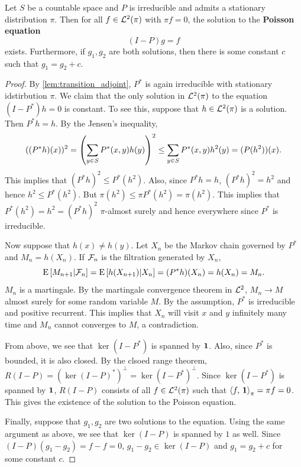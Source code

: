 \begin{theorem}\label{thm:poisson_eq}
    Let $S$ be a countable space and $P$ is irreducible and admits a stationary 
    distribution $\pi$. Then for all $f\in\mathcal{L}^2(\pi)$ with $\pi f = 0$, the solution 
    to the \textbf{Poisson equation} 
    \begin{equation*}
        (I-P)g = f
    \end{equation*}
    exists. Furthermore, if $g_1,g_2$ are both solutions, then there is some 
    constant $c$ such that $g_1 = g_2+c$. 
\end{theorem}
\begin{proof}
    By \cref{lem:transition_adjoint}, $P^*$ is again irreducible with stationary 
    idstirbution $\pi$. We claim that the only solution in $\mathcal{L}^2(\pi)$ to the equation 
    $(I-P^*)h = 0$ is constant. To see this, suppose that $h\in\mathcal{L}^2(\pi)$ is 
    a solution. Then $P^*h = h$. By the Jensen's inequality, 
    \begin{equation*}
        ((P^*h)(x))^2 = \pth{\sum_{y\in S} P^*(x,y)h(y)}^2\leq \sum_{y\in S}P^*(x,y)h^2(y) 
        = (P(h^2))(x). 
    \end{equation*} 
    This implies that $(P^*h)^2 \leq P^*(h^2)$. Also, since $P^*h = h$, $(P^*h)^2 = h^2$ 
    and hence $h^2\leq P^*(h^2)$. But $\pi(h^2) \leq \pi P^*(h^2) = \pi (h^2)$. 
    This implies that $P^*(h^2) = h^2 = (P^*h)^2$ $\pi$-almost surely and hence 
    everywhere since $P^*$ is irreducible. 
    
    Now suppose that $h(x)\neq h(y)$. Let $X_n$ be the Markov chain governed 
    by $P^*$ and $M_n = h(X_n)$. If $\mathcal{F}_n$ is the filtration generated by $X_n$, 
    \begin{equation*}
        \operatorname{E}\left[ {M_{n+1}|\mathcal{F}_n} \right] = \operatorname{E}\left[ {h(X_{n+1})|X_n} \right] = (P^*h)(X_n) = h(X_n) 
        = M_n.
    \end{equation*} 
    $M_n$ is a martingale. By the martingale convergence theorem in $\mathcal{L}^2$, 
    $M_n\to M$ almost surely for some random variable $M$. By the assumption, 
    $P^*$ is irreducible and positive recurrent. This implies that $X_n$ will 
    visit $x$ and $y$ infinitely many time and $M_n$ cannot converges to $M$, 
    a contradiction. 

    From above, we see that $\ker(I-P^*)$ is spanned by $\mathbf{1}$. Also, since $P^*$ 
    is bounded, it is also closed. By the clsoed range theorem, $R(I-P) 
    = (\ker(I-P)^*)^\perp = \ker(I-P^*)^\perp$. Since $\ker(I-P^*)$ is spanned 
    by $\mathbf{1}$, $R(I-P)$ consists of all $f\in \mathcal{L}^2(\pi)$ such that $\left\langle {f},\, {\mathbf{1}} \right\rangle_{\pi} 
    = \pi f = 0$. This gives the existence of the solution to the Poisson 
    equation. 

    Finally, suppose that $g_1,g_2$ are two solutions to the equation. Using 
    the same argument as above, we see that $\ker(I-P)$ is spanned by $1$ as 
    well. Since $(I-P)(g_1-g_2) = f - f = 0$, $g_1-g_2\in \ker(I-P)$ and 
    $g_1 = g_2 + c$ for some constant $c$. 
\end{proof}

